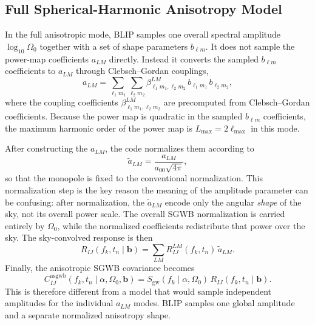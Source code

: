 \documentclass[11pt]{article}
\begin{document}
\subsection{Full Spherical-Harmonic Anisotropy Model}
In the full anisotropic mode, BLIP samples one overall spectral amplitude $\log_{10}\Omega_0$ together with a set of shape parameters $b_{\ell m}$. It does not sample the power-map coefficients $a_{LM}$ directly. Instead it converts the sampled $b_{\ell m}$ coefficients to $a_{LM}$ through Clebsch--Gordan couplings,
\begin{equation}
a_{LM}=\sum_{\ell_1 m_1}\sum_{\ell_2 m_2}
\beta^{LM}_{\ell_1 m_1,\ell_2 m_2}\,
b_{\ell_1 m_1}\,b_{\ell_2 m_2},
\end{equation}
where the coupling coefficients $\beta^{LM}_{\ell_1 m_1,\ell_2 m_2}$ are precomputed from Clebsch--Gordan coefficients. Because the power map is quadratic in the sampled $b_{\ell m}$ coefficients, the maximum harmonic order of the power map is $L_{\max}=2\ell_{\max}$ in this mode.

After constructing the $a_{LM}$, the code normalizes them according to
\begin{equation}
\tilde{a}_{LM}=\frac{a_{LM}}{a_{00}\sqrt{4\pi}},
\end{equation}
so that the monopole is fixed to the conventional normalization. This normalization step is the key reason the meaning of the amplitude parameter can be confusing: after normalization, the $\tilde{a}_{LM}$ encode only the angular \emph{shape} of the sky, not its overall power scale. The overall SGWB normalization is carried entirely by $\Omega_0$, while the normalized coefficients redistribute that power over the sky. The sky-convolved response is then
\begin{equation}
R_{IJ}(f_k,t_n\mid \bm{b})
=\sum_{LM} R_{IJ}^{LM}(f_k,t_n)\,\tilde{a}_{LM}.
\end{equation}
Finally, the anisotropic SGWB covariance becomes
\begin{equation}
C_{IJ}^{\mathrm{asgwb}}(f_k,t_n\mid \alpha,\Omega_0,\bm{b})
=S_{\mathrm{gw}}(f_k\mid \alpha,\Omega_0)\,
R_{IJ}(f_k,t_n\mid \bm{b}).
\end{equation}
This is therefore different from a model that would sample independent amplitudes for the individual $a_{LM}$ modes. BLIP samples one global amplitude and a separate normalized anisotropy shape.
\end{document}
